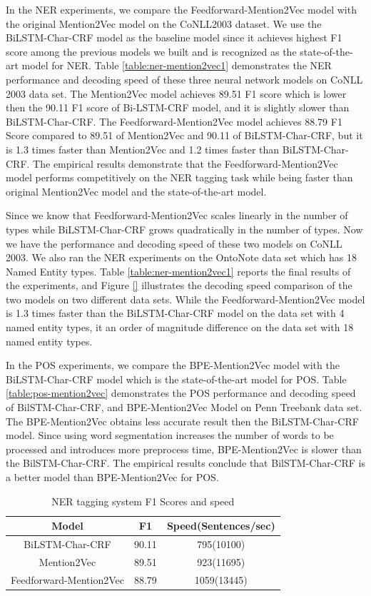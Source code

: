 \documentclass{sfuthesis}
\begin{document}
In the NER experiments, we compare the Feedforward-Mention2Vec model with the original Mention2Vec model on the CoNLL2003 dataset. We use the BiLSTM-Char-CRF model as the baseline model since it achieves highest F1 score among the previous models we built and is recognized as the state-of-the-art model for NER. Table \ref{table:ner-mention2vec1} demonstrates the NER performance and decoding speed of these three neural network models on CoNLL 2003 data set. The Mention2Vec model achieves 89.51 F1 score which is lower then the 90.11 F1 score of Bi-LSTM-CRF model, and it is slightly slower than BiLSTM-Char-CRF. The Feedforward-Mention2Vec model achieves 88.79 F1 Score compared to 89.51 of Mention2Vec and 90.11 of BiLSTM-Char-CRF, but it is 1.3 times faster than Mention2Vec and 1.2 times faster than BiLSTM-Char-CRF. The empirical results demonstrate that the Feedforward-Mention2Vec model performs competitively on the NER tagging task while being faster than original Mention2Vec model and the state-of-the-art model.

Since we know that Feedforward-Mention2Vec scales linearly in the number of types while BiLSTM-Char-CRF grows quadratically in the number of types. Now we have the performance and decoding speed of these two models on CoNLL 2003. We also ran the NER experiments on the OntoNote data set which has 18 Named Entity types. Table \ref{table:ner-mention2vec1} reports the final results of the experiments, and Figure \ref{} illustrates the decoding speed comparison of the two models on two different data sets. While the Feedforward-Mention2Vec model is 1.3 times faster than the BiLSTM-Char-CRF model on the data set with 4 named entity types, it an order of magnitude difference on the data set with 18 named entity types.

In the POS experiments, we compare the BPE-Mention2Vec model with the BiLSTM-Char-CRF model which is the state-of-the-art model for POS. Table \ref{table:pos-mention2vec} demonstrates the POS performance and decoding speed of BilSTM-Char-CRF, and BPE-Mention2Vec Model on Penn Treebank data set. The BPE-Mention2Vec obtains less accurate result then the BiLSTM-Char-CRF model. Since using word segmentation increases the number of words to be processed and introduces more preprocess time, BPE-Mention2Vec is slower than the BilSTM-Char-CRF. The empirical results conclude that BilSTM-Char-CRF is a better model than BPE-Mention2Vec for POS. 

\begin{table}[]
\centering
\caption{NER tagging system F1 Scores and speed }
\label{table:ner-mention2vec}
\begin{tabular}{|c|c|c|}
\hline
Model            & F1     & Speed(Sentences/sec)        \\ \hline
BiLSTM-Char-CRF & 90.11  & 795(10100)            \\ \hline
Mention2Vec  & 89.51     & 923(11695)              \\ \hline
Feedforward-Mention2Vec      & 88.79  &  1059(13445)                   \\ \hline
\end{tabular}
\end{table}
\end{document}
